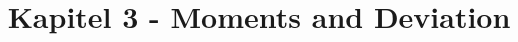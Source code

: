 
\title{Kapitel 3 - Moments and Deviation}


\maketitle
\tableofcontents
\newpage


\newpage


\newpage


\newpage


\newpage


\newpage



